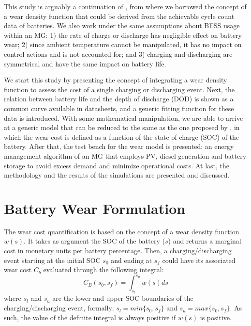 \documentclass{ieeeaccess}
\begin{document}
    This study is arguably a continuation of \cite{HAN2014}, from where we borrowed the concept of a wear density function that could be derived from the achievable cycle count data of batteries. We also work under the same assumptions about BESS usage within an MG: 1) the rate of charge or discharge has negligible effect on battery wear; 2) since ambient temperature cannot be manipulated, it has no impact on control actions and is not accounted for; and 3) charging and discharging are symmetrical and have the same impact on battery life.

    We start this study by presenting the concept of integrating a wear density function to assess the cost of a single charging or discharging event. Next, the relation between battery life and the depth of discharge (DOD) is shown as a common curve available in datasheets, and a generic fitting function for these data is introduced. With some mathematical manipulation, we are able to arrive at a generic model that can be reduced to the same as the one proposed by \cite{HAN2014}, in which the wear cost is defined as a function of the state of charge (SOC) of the battery. After that, the test bench for the wear model is presented: an energy management algorithm of an MG that employs PV, diesel generation and battery storage to avoid excess demand and minimize operational costs. At last, the methodology and the results of the simulations are presented and discussed.


    \section{Battery Wear Formulation}

    The wear cost quantification is based on the concept of a wear density function $w(s)$. It takes as argument the SOC of the battery ($s$) and returns a marginal cost in monetary units per battery percentage. Then, a charging/discharging event starting at the initial SOC $s_{0}$ and ending at $s_{f}$ could have its associated wear cost $C_{b}$ evaluated through the following integral:
    \begin{equation}
        C_{B}(s_{0}, s_{f}) = \int_{s_{l}}^{s_{u}}w(s)ds
        \label{eq:Cb(s0,sf)}
    \end{equation}
    where $s_{l}$ and $s_{u}$ are the lower and upper SOC boundaries of the charging/discharging event, formally: $s_{l} = min\{s_{0}, s_{f}\}$ and $s_{u} = max\{s_{0}, s_{f}\}$. As such, the value of the definite integral is always positive if $w(s)$ is positive.
\end{document}
